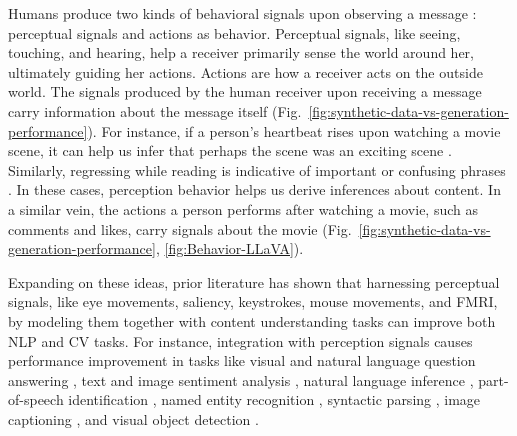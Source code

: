Humans produce two kinds of behavioral signals upon observing a message \cite{bertenthal1996origins,prinz1997perception}: perceptual signals and actions as behavior. Perceptual signals, like seeing, touching, and hearing, help a receiver primarily sense the world around her, ultimately guiding her actions. Actions are how a receiver acts on the outside world. 
The signals produced by the human receiver upon receiving a message carry information about the message itself (Fig.~\ref{fig:synthetic-data-vs-generation-performance}). For instance, if a person's heartbeat rises upon watching a movie scene, it can help us infer that perhaps the scene was an exciting scene \cite{dzedzickis2020human}. Similarly, regressing while reading is indicative of important or confusing phrases \cite{bicknell2011readers}. In these cases, perception behavior helps us derive inferences about content. In a similar vein, the actions a person performs after watching a movie, such as comments and likes, carry signals about the movie (Fig.~\ref{fig:synthetic-data-vs-generation-performance}, \ref{fig:Behavior-LLaVA}). 

Expanding on these ideas, prior literature has shown that harnessing perceptual signals, like eye movements, saliency, keystrokes, mouse movements, and FMRI, by modeling them together with content understanding tasks can improve both NLP and CV tasks. For instance, integration with perception signals causes performance improvement in tasks like visual and natural language question answering \cite{patro2018differential,khurana-etal-2023-synthesizing,sood2020improving}, text and image sentiment analysis \cite{khurana-etal-2023-synthesizing,barrett-etal-2018-sequence,fan2018emotional}, natural language inference \cite{khurana-etal-2023-synthesizing}, part-of-speech identification \cite{barrett-etal-2016-weakly,barrett-etal-2016-cross}, named entity recognition \cite{hollenstein2019advancing,NoraNEREyeTracking}, syntactic parsing \cite{plank2016keystroke}, image captioning \cite{cornia2018paying}, and visual object detection \cite{wang2018salient,kruthiventi2016saliency}. %



